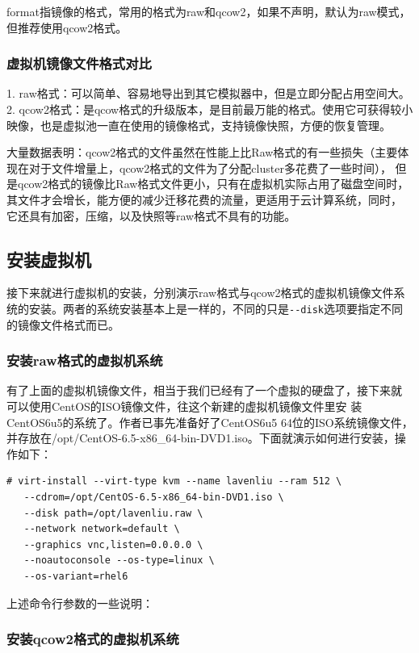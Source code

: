 format指镜像的格式，常用的格式为raw和qcow2，如果不声明，默认为raw模式，
但推荐使用qcow2格式。

\subsubsection{虚拟机镜像文件格式对比}
\label{sec:createImgContrast}

1.	raw格式：可以简单、容易地导出到其它模拟器中，但是立即分配占用空间大。
2.	qcow2格式：是qcow格式的升级版本，是目前最万能的格式。使用它可获得较小映像，也是虚拟池一直在使用的镜像格式，支持镜像快照，方便的恢复管理。

大量数据表明：qcow2格式的文件虽然在性能上比Raw格式的有一些损失（主要体
现在对于文件增量上，qcow2格式的文件为了分配cluster多花费了一些时间），
但是qcow2格式的镜像比Raw格式文件更小，只有在虚拟机实际占用了磁盘空间时，
其文件才会增长，能方便的减少迁移花费的流量，更适用于云计算系统，同时，
它还具有加密，压缩，以及快照等raw格式不具有的功能。

\subsection{安装虚拟机}
\label{sec:installVM}

接下来就进行虚拟机的安装，分别演示raw格式与qcow2格式的虚拟机镜像文件系统的安装。两者的系统安装基本上是一样的，不同的只是\verb|--disk|选项要指定不同的镜像文件格式而已。

\subsubsection{安装raw格式的虚拟机系统}
\label{sec:installRawVM}

有了上面的虚拟机镜像文件，相当于我们已经有了一个虚拟的硬盘了，接下来就
可以使用CentOS的ISO镜像文件，往这个新建的虚拟机镜像文件里安
装CentOS6u5的系统了。作者已事先准备好了CentOS6u5 64位的ISO系统镜像文件，
并存放在/opt/CentOS-6.5-x86\_64-bin-DVD1.iso。下面就演示如何进行安装，操
作如下：

\begin{verbatim}
# virt-install --virt-type kvm --name lavenliu --ram 512 \
   --cdrom=/opt/CentOS-6.5-x86_64-bin-DVD1.iso \
   --disk path=/opt/lavenliu.raw \
   --network network=default \
   --graphics vnc,listen=0.0.0.0 \
   --noautoconsole --os-type=linux \
   --os-variant=rhel6
\end{verbatim}

上述命令行参数的一些说明：

\subsubsection{安装qcow2格式的虚拟机系统}
\label{sec:installQcow2VM}

